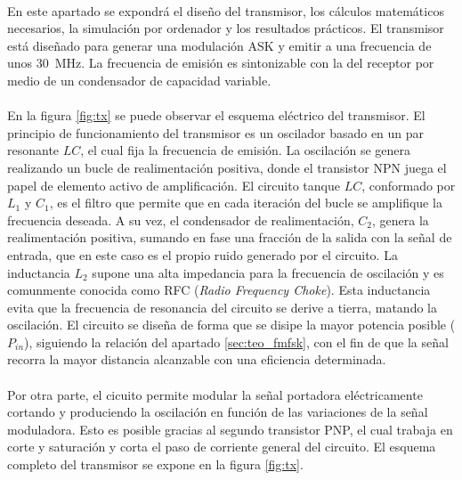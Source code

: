 \paragraph{}
En este apartado se expondr\'a el diseño del transmisor, los c\'alculos matem\'aticos necesarios, la simulaci\'on por ordenador y los resultados pr\'acticos.
El transmisor está diseñado para generar una modulación ASK y emitir a una frecuencia de unos \SI{30}{\mega\hertz}. La frecuencia de emisión es sintonizable con la del receptor por medio de un condensador de capacidad variable.
\paragraph{}
En la figura \ref{fig:tx} se puede observar el esquema eléctrico del transmisor.
El principio de funcionamiento del transmisor es un oscilador basado en un par resonante $LC$, el cual fija la frecuencia de emisión. 
La oscilaci\'on se genera realizando un bucle de realimentación positiva, donde el transistor NPN juega el papel de elemento activo de amplificación. 
El circuito tanque $LC$, conformado por $L_1$ y $C_1$, es el filtro que permite que en cada iteración del bucle se amplifique la frecuencia deseada. A su vez, el condensador de realimentación, $C_2$, genera la realimentación positiva, sumando en fase una fracción de la salida con la señal de entrada, que en este caso es el propio ruido generado por el circuito.
La inductancia $L_2$ supone una alta impedancia para la frecuencia de oscilaci\'on y es comunmente conocida como RFC (\textit{Radio Frequency Choke}). Esta inductancia evita que la frecuencia de resonancia del circuito se derive a tierra, matando la oscilación.
El circuito se diseña de forma que se disipe la mayor potencia posible ($P_{in}$), siguiendo la relaci\'on del apartado \ref{sec:teo_fmfsk}, con el fin de que la señal recorra la mayor distancia alcanzable con una eficiencia determinada.
\paragraph{}
Por otra parte, el cicuito permite modular la señal portadora eléctricamente cortando y produciendo la oscilación en función de las variaciones de la señal moduladora. Esto es posible gracias al segundo transistor PNP, el cual trabaja en corte y saturaci\'on y corta el paso de corriente general del circuito.
El esquema completo del transmisor se expone en la figura \ref{fig:tx}.

